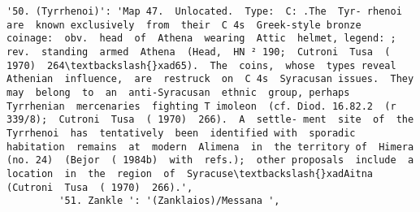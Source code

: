 \documentclass[11pt]{article}
\begin{document}
\begin{Verbatim}[commandchars=\\\{\}]
         '50. (Tyrrhenoi)': 'Map 47.  Unlocated.  Type:  C: .The  Tyr- rhenoi  are  known exclusively  from  their  C 4s  Greek-style bronze  coinage:  obv.  head  of  Athena  wearing  Attic  helmet, legend: ;  rev.  standing  armed  Athena  (Head,  HN ² 190;  Cutroni  Tusa  ( 1970)  264\textbackslash{}xad65).  The  coins,  whose  types reveal  Athenian  influence,  are  restruck  on  C 4s  Syracusan issues.  They  may  belong  to  an  anti-Syracusan  ethnic  group, perhaps  Tyrrhenian  mercenaries  fighting T imoleon  (cf. Diod. 16.82.2  (r 339/8);  Cutroni  Tusa  ( 1970)  266).  A  settle- ment  site  of  the  Tyrrhenoi  has  tentatively  been  identified with  sporadic  habitation  remains  at  modern  Alimena  in  the territory of  Himera  (no. 24)  (Bejor  ( 1984b)  with  refs.);  other proposals  include  a  location  in  the  region  of  Syracuse\textbackslash{}xadAitna (Cutroni  Tusa  ( 1970)  266).',
         '51. Zankle ': '(Zanklaios)/Messana ',

\end{Verbatim}
\end{document}
